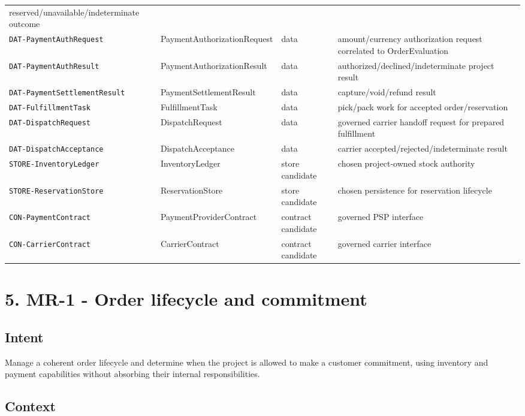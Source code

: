 \documentclass[
  10pt,
]{article}
\begin{document}
\begin{longtable}[]{@{}llll@{}}
reserved/unavailable/indeterminate outcome \\
\texttt{DAT-PaymentAuthRequest} & PaymentAuthorizationRequest & data &
amount/currency authorization request correlated to OrderEvaluation \\
\texttt{DAT-PaymentAuthResult} & PaymentAuthorizationResult & data &
authorized/declined/indeterminate project result \\
\texttt{DAT-PaymentSettlementResult} & PaymentSettlementResult & data &
capture/void/refund result \\
\texttt{DAT-FulfillmentTask} & FulfillmentTask & data & pick/pack work
for accepted order/reservation \\
\texttt{DAT-DispatchRequest} & DispatchRequest & data & governed carrier
handoff request for prepared fulfillment \\
\texttt{DAT-DispatchAcceptance} & DispatchAcceptance & data & carrier
accepted/rejected/indeterminate result \\
\texttt{STORE-InventoryLedger} & InventoryLedger & store candidate &
chosen project-owned stock authority \\
\texttt{STORE-ReservationStore} & ReservationStore & store candidate &
chosen persistence for reservation lifecycle \\
\texttt{CON-PaymentContract} & PaymentProviderContract & contract
candidate & governed PSP interface \\
\texttt{CON-CarrierContract} & CarrierContract & contract candidate &
governed carrier interface \\
\end{longtable}

\section{5. MR-1 - Order lifecycle and
commitment}\label{5-mr-1---order-lifecycle-and-commitment}

\subsection{Intent}\label{intent}

Manage a coherent order lifecycle and determine when the project is
allowed to make a customer commitment, using inventory and payment
capabilities without absorbing their internal responsibilities.

\subsection{Context}\label{context}
\end{document}

